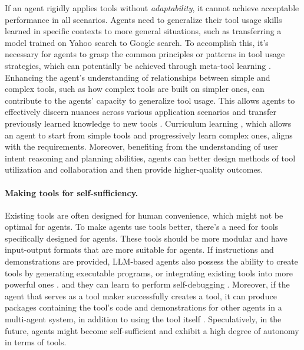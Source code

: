 If an agent rigidly applies tools without \textit{adaptability}, it cannot achieve acceptable performance in all scenarios. Agents need to generalize their tool usage skills learned in specific contexts to more general situations, such as transferring a model trained on Yahoo search to Google search. To accomplish this, it's necessary for agents to grasp the common principles or patterns in tool usage strategies, which can potentially be achieved through meta-tool learning \cite{Clarebout2013}. Enhancing the agent's understanding of relationships between simple and complex tools, such as how complex tools are built on simpler ones, can contribute to the agents' capacity to generalize tool usage. This allows agents to effectively discern nuances across various application scenarios and transfer previously learned knowledge to new tools \cite{DBLP:journals/corr/abs-2304-08354}. Curriculum learning \cite{10.1145/1553374.1553380}, which allows an agent to start from simple tools and progressively learn complex ones, aligns with the requirements. Moreover, benefiting from the understanding of user intent reasoning and planning abilities, agents can better design methods of tool utilization and collaboration and then provide higher-quality outcomes.

\paragraph{Making tools for self-sufficiency.}
Existing tools are often designed for human convenience, which might not be optimal for agents. To make agents use tools better, there's a need for tools specifically designed for agents. These tools should be more modular and have input-output formats that are more suitable for agents. 
If instructions and demonstrations are provided, LLM-based agents also possess the ability to create tools by generating executable programs, or integrating existing tools into more powerful ones \cite{DBLP:journals/corr/abs-2304-08354,DBLP:journals/corr/abs-2305-14318, chen2021evaluating}. and they can learn to perform self-debugging \cite{DBLP:journals/corr/abs-2304-05128}.
Moreover, if the agent that serves as a tool maker successfully creates a tool, it can produce packages containing the tool's code and demonstrations for other agents in a multi-agent system, in addition to using the tool itself \cite{DBLP:journals/corr/abs-2305-17126}.
Speculatively, in the future, agents might become self-sufficient and exhibit a high degree of autonomy in terms of tools. 

